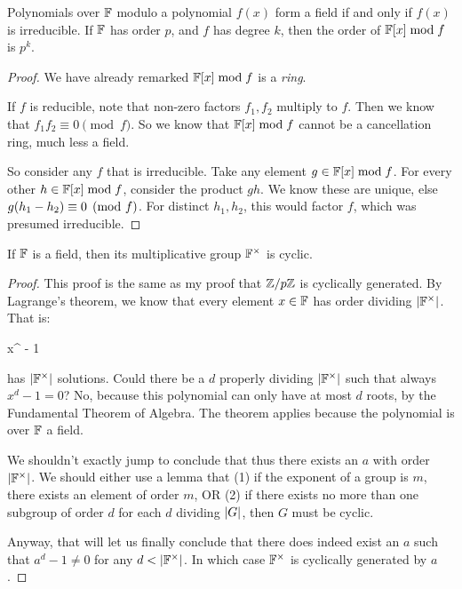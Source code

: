 \begin{theorem}
  Polynomials over $\mathbb{F}$ modulo a polynomial $f(x)$ form a field if and
  only if $f(x)$ is irreducible. If $\mathbb{F}$ has order $p$, and $f$ has
  degree $k$, then the order of $\mathbb{F}[x] \bmod f$ is $p^k$.
\end{theorem}

\begin{proof}
  We have already remarked $\mathbb{F}[x] \bmod f$ is a \emph{ring}.

  If $f$ is reducible, note that non-zero factors $f_1, f_2$ multiply to
  $f$. Then we know that $f_1 f_2 \equiv 0 \pmod{f}$. So we know that
  $\mathbb{F}[x] \bmod f$ cannot be a cancellation ring, much less a field.

  So consider any $f$ that is irreducible. Take any element $g \in \mathbb{F}[x]
  \bmod f$. For every other $h \in \mathbb{F}[x] \bmod f$, consider the product
  $g h$. We know these are unique, else $g \mathopen{}\left( {h_1 - h_2} \right)\mathclose{} \equiv 0
  \pmod{f}$. For distinct $h_1, h_2$, this would factor $f$, which was
  presumed irreducible.
\end{proof}

\begin{theorem}
  If $\mathbb{F}$ is a field, then its multiplicative group $\mathbb{F}^\times$ is
  cyclic.
\end{theorem}

\begin{proof}
  This proof is the same as my proof that $\mathbb{Z} / p\mathbb{Z}$ is cyclically
  generated. By Lagrange's theorem, we know that every element $x\in\mathbb{F}$
  has order dividing $|\mathbb{F}^\times|$. That is:

  \begin{nedqn}
    x^{\order{\F^\times}} - 1
  \end{nedqn}

  \noindent
  has $|\mathbb{F}^\times|$ solutions. Could there be a $d$ properly
  dividing $|\mathbb{F}^\times|$ such that always $x^d - 1 = 0$? No,
  because this polynomial can only have at most $d$ roots, by the
  Fundamental Theorem of Algebra. The theorem applies because the
  polynomial is over $\mathbb{F}$ a field.

  We shouldn't exactly jump to conclude that thus there exists an $a$
  with order $|\mathbb{F}^\times|$. We should either use a lemma that (1)
  if the exponent of a group is $m$, there exists an element of order
  $m$, OR (2) if there exists no more than one subgroup of order $d$ for
  each $d$ dividing $|G|$, then $G$ must be cyclic.

  Anyway, that will let us finally conclude that there does indeed exist
  an $a$ such that $a^d - 1 \ne 0$ for any $d < |\mathbb{F}^\times|$. In
  which case $\mathbb{F}^\times$ is cyclically generated by $a$.
\end{proof}


